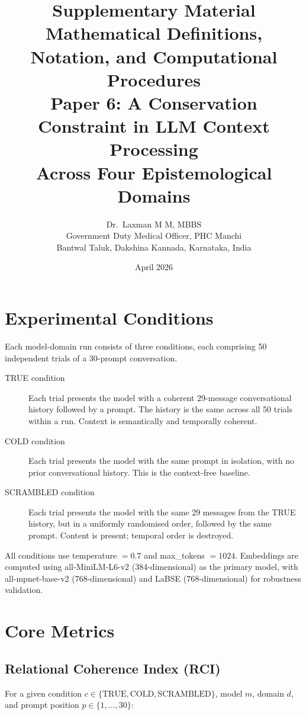 \documentclass[11pt,a4paper]{article}
\title{\LARGE\textbf{Supplementary Material}\\
\large Mathematical Definitions, Notation, and Computational Procedures\\
\normalsize Paper 6: A Conservation Constraint in LLM Context Processing\\
Across Four Epistemological Domains}
\author{Dr.\ Laxman M M, MBBS\\
Government Duty Medical Officer, PHC Manchi\\
Bantwal Taluk, Dakshina Kannada, Karnataka, India}
\date{April 2026}
\begin{document}
\maketitle
\tableofcontents
\newpage

\section{Experimental Conditions}

Each model-domain run consists of three conditions, each comprising 50 independent
trials of a 30-prompt conversation.

\begin{description}
    \item[TRUE condition] Each trial presents the model with a coherent 29-message
    conversational history followed by a prompt. The history is the same across all
    50 trials within a run. Context is semantically and temporally coherent.

    \item[COLD condition] Each trial presents the model with the same prompt in
    isolation, with no prior conversational history. This is the context-free baseline.

    \item[SCRAMBLED condition] Each trial presents the model with the same 29 messages
    from the TRUE history, but in a uniformly randomised order, followed by the same
    prompt. Content is present; temporal order is destroyed.
\end{description}

\noindent All conditions use temperature $= 0.7$ and max\_tokens $= 1024$.
Embeddings are computed using all-MiniLM-L6-v2 (384-dimensional) as the primary model,
with all-mpnet-base-v2 (768-dimensional) and LaBSE (768-dimensional) for robustness
validation.

\section{Core Metrics}

\subsection{Relational Coherence Index (RCI)}

For a given condition $c \in \{\text{TRUE}, \text{COLD}, \text{SCRAMBLED}\}$,
model $m$, domain $d$, and prompt position $p \in \{1, \ldots, 30\}$:
\end{document}
